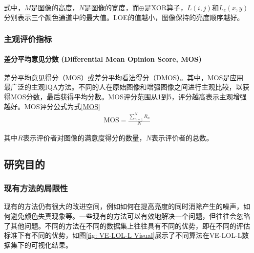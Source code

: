 \documentclass[a4paper]{ctexart}
\begin{document}
	式中，$M$是图像的高度，$N$是图像的宽度，而$\oplus$是XOR算子，$L(i, j)$和$L_{e}(x, y)$分别表示三个颜色通道中的最大值。LOE的值越小，图像保持的亮度顺序越好。
	
	\subsubsection{主观评价指标}
	
	\paragraph{差分平均意见分数 (Differential Mean Opinion Score, MOS)}
	
	差分平均意见得分（MOS）或差分平均看法得分（DMOS）。其中，MOS是应用最广泛的主观IQA方法。不同的人在原始图像和增强图像之间进行主观比较，以获得MOS分数，最后获得平均分数。MOS评分范围从1到5，评分越高表示主观增强越好。MOS评分公式为式\ref{MOS}
	\begin{equation}
		\begin{aligned}
			\text{MOS} = \frac{\sum_{n=1}^{N} R_{n}} {N}
		\end{aligned}
		\label{eq: MOS}
	\end{equation}
	
	其中$R$表示评价者对图像的满意度得分的数量，$N$表示评价者的总数。
	
	\subsection{研究目的}
	
	\subsubsection{现有方法的局限性}
	
	现有的方法仍有很大的改进空间，例如如何在提高亮度的同时消除产生的噪声，如何避免颜色失真现象等。一些现有的方法可以有效地解决一个问题，但往往会忽略了其他问题。不同的方法在不同的数据集上往往具有不同的优势，即在不同的评估标准下有不同的优势，如图\ref{fig: VE-LOL-L Visual}展示了不同算法在VE-LOL-L数据集下的可视化结果。
	
\end{document}
